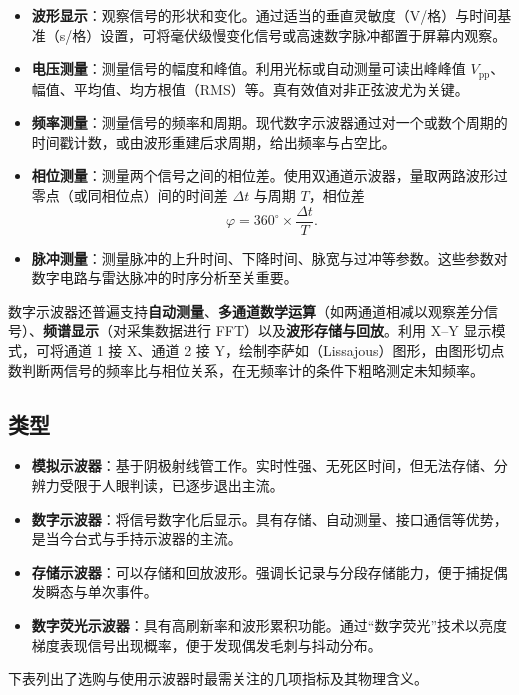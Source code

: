 \begin{itemize}
    \item \textbf{波形显示}：观察信号的形状和变化。通过适当的垂直灵敏度（V/格）与时间基准（s/格）设置，可将毫伏级慢变化信号或高速数字脉冲都置于屏幕内观察。
    \item \textbf{电压测量}：测量信号的幅度和峰值。利用光标或自动测量可读出峰峰值 $V_{\mathrm{pp}}$、幅值、平均值、均方根值（RMS）等。真有效值对非正弦波尤为关键。
    \item \textbf{频率测量}：测量信号的频率和周期。现代数字示波器通过对一个或数个周期的时间戳计数，或由波形重建后求周期，给出频率与占空比。
    \item \textbf{相位测量}：测量两个信号之间的相位差。使用双通道示波器，量取两路波形过零点（或同相位点）间的时间差 $\Delta t$ 与周期 $T$，相位差
    \[
        \varphi = 360^\circ \times \frac{\Delta t}{T} .
    \]
    \item \textbf{脉冲测量}：测量脉冲的上升时间、下降时间、脉宽与过冲等参数。这些参数对数字电路与雷达脉冲的时序分析至关重要。
\end{itemize}

数字示波器还普遍支持\textbf{自动测量}、\textbf{多通道数学运算}（如两通道相减以观察差分信号）、\textbf{频谱显示}（对采集数据进行 FFT）以及\textbf{波形存储与回放}。利用 X--Y 显示模式，可将通道 1 接 X、通道 2 接 Y，绘制李萨如（Lissajous）图形，由图形切点数判断两信号的频率比与相位关系，在无频率计的条件下粗略测定未知频率。

\subsection{类型}

\begin{itemize}
    \item \textbf{模拟示波器}：基于阴极射线管工作。实时性强、无死区时间，但无法存储、分辨力受限于人眼判读，已逐步退出主流。
    \item \textbf{数字示波器}：将信号数字化后显示。具有存储、自动测量、接口通信等优势，是当今台式与手持示波器的主流。
    \item \textbf{存储示波器}：可以存储和回放波形。强调长记录与分段存储能力，便于捕捉偶发瞬态与单次事件。
    \item \textbf{数字荧光示波器}：具有高刷新率和波形累积功能。通过“数字荧光”技术以亮度梯度表现信号出现概率，便于发现偶发毛刺与抖动分布。
\end{itemize}

下表列出了选购与使用示波器时最需关注的几项指标及其物理含义。

